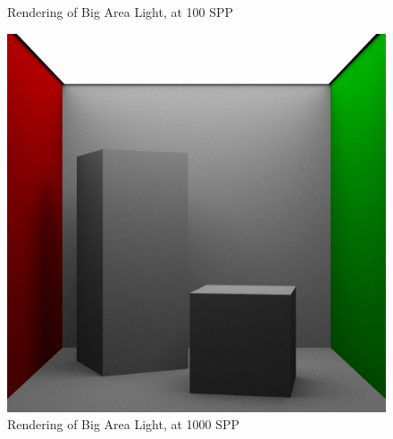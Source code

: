 \documentclass[a4paper]{myarticle}
\begin{document}
\begin{figure}[H]
\begin{minipage}[t]{.3\textwidth}
      \caption{Rendering of Big Area Light, at 100 SPP}
  \end{minipage}
  \hfill
  \begin{minipage}[t]{.3\textwidth}
      \centering
      \includegraphics[width=\textwidth]{q3/big_0_1000.png}
      \caption{Rendering of Big Area Light, at 1000 SPP}
  \end{minipage}
\end{figure}
\end{document}
